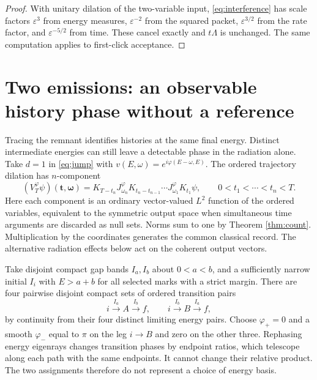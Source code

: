 \documentclass[11pt]{article}
\begin{document}
\begin{proof}
With unitary dilation of the two-variable input, \eqref{eq:interference} has scale factors
\(\varepsilon^3\) from energy measures, \(\varepsilon^{-2}\) from the squared packet, \(\varepsilon^{3/2}\) from the rate factor, and \(\varepsilon^{-5/2}\) from time. These cancel exactly and \(t\Lambda\) is unchanged. The same computation applies to first-click acceptance.
\end{proof}

\section{Two emissions: an observable history phase without a reference}
Tracing the remnant identifies histories at the same final energy. Distinct intermediate energies can still leave a detectable phase in the radiation alone. Take \(d=1\) in \eqref{eq:jump} with \(v(E,\omega)=e^{i\varphi(E-\omega,E)}\). The ordered trajectory dilation has \(n\)-component
\begin{equation}
 (V_T^\varphi\psi)(\mathbf t,\boldsymbol\omega)=
 K_{T-t_n}J_{\omega_n}^\varphi K_{t_n-t_{n-1}}\cdots
 J_{\omega_1}^\varphi K_{t_1}\psi,\qquad 0<t_1<\cdots<t_n<T.        \label{eq:traj}
\end{equation}
Here each component is an ordinary vector-valued \(L^2\) function of the ordered variables, equivalent to the symmetric output space when simultaneous time arguments are discarded as null sets. Norms sum to one by Theorem \ref{thm:count}. Multiplication by the coordinates generates the common classical record. The alternative radiation effects below act on the coherent output vectors.

Take disjoint compact gap bands \(I_a,I_b\) about \(0<a<b\), and a sufficiently narrow initial \(I_i\) with \(E>a+b\) for all selected marks with a strict margin. There are four pairwise disjoint compact sets of ordered transition pairs
\[
       i\xrightarrow{I_a}A\xrightarrow{I_b}f,\qquad
       i\xrightarrow{I_b}B\xrightarrow{I_a}f,
\]
by continuity from their four distinct limiting energy pairs. Choose \(\varphi_+=0\) and a smooth \(\varphi_-\) equal to \(\pi\) on the leg \(i\to B\) and zero on the other three. Rephasing energy eigenrays changes transition phases by endpoint ratios, which telescope along each path with the same endpoints. It cannot change their relative product. The two assignments therefore do not represent a choice of energy basis.
\end{document}

